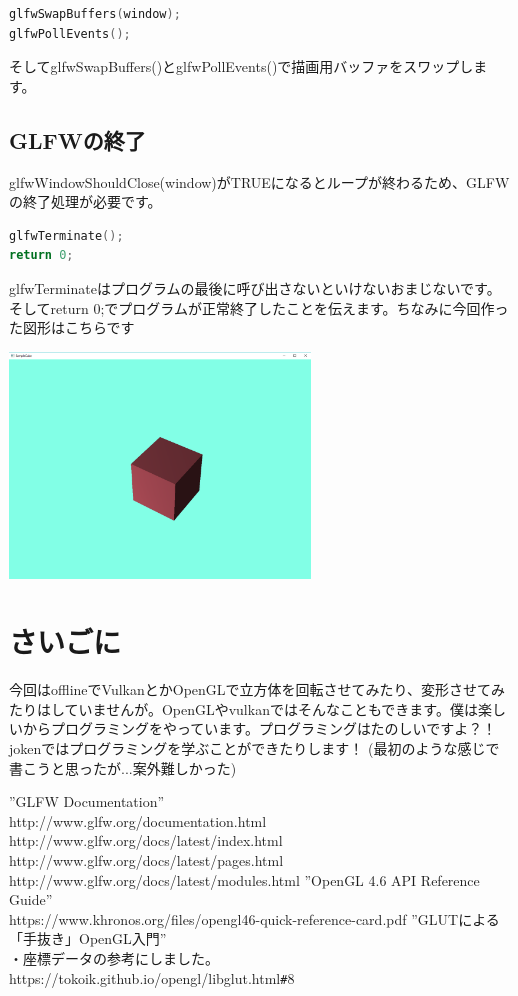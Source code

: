 \documentclass[a4paper,titlepage,dvipdfmx]{jsarticle}
\begin{document}
\begin{lstlisting}[language=C++]
glfwSwapBuffers(window);
glfwPollEvents();
\end{lstlisting}
そしてglfwSwapBuffers()とglfwPollEvents()で描画用バッファをスワップします。

\subsection{GLFWの終了}
glfwWindowShouldClose(window)がTRUEになるとループが終わるため、GLFWの終了処理が必要です。
\begin{lstlisting}[language=C++]
glfwTerminate();
return 0;
\end{lstlisting}
glfwTerminateはプログラムの最後に呼び出さないといけないおまじないです。そしてreturn 0;でプログラムが正常終了したことを伝えます。ちなみに今回作った図形はこちらです


\begin{center}
 \includegraphics[width=8cm]{SampleCube.png}
\end{center}

\section{さいごに}
今回はofflineでVulkanとかOpenGLで立方体を回転させてみたり、変形させてみたりはしていませんが。OpenGLやvulkanではそんなこともできます。僕は楽しいからプログラミングをやっています。プログラミングはたのしいですよ？！jokenではプログラミングを学ぶことができたりします！
(最初のような感じで書こうと思ったが...案外難しかった)

\begin{thebibliography}{99}
 ''GLFW Documentation'' \\
 http://www.glfw.org/documentation.html \\
 http://www.glfw.org/docs/latest/index.html \\
 http://www.glfw.org/docs/latest/pages.html \\
 http://www.glfw.org/docs/latest/modules.html
 ''OpenGL 4.6 API Reference Guide'' \\
 https://www.khronos.org/files/opengl46-quick-reference-card.pdf
 ''GLUTによる「手抜き」OpenGL入門'' \\
 ・座標データの参考にしました。\\
 https://tokoik.github.io/opengl/libglut.html\verb|#|8
\end{thebibliography}
\end{document}
